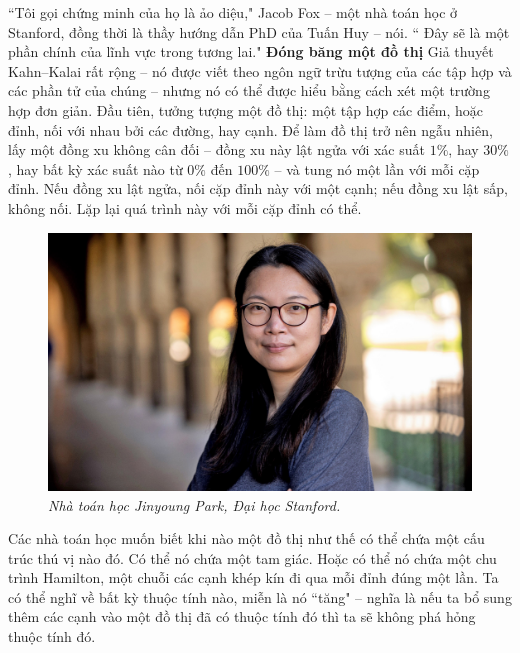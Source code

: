 \begin{multicols}{2}
	\vskip 0.1cm
	``Tôi gọi chứng minh của họ là ảo diệu,"  Jacob Fox -- một nhà toán học ở Stanford, đồng thời là thầy hướng dẫn PhD của Tuấn Huy -- nói. `` Đây sẽ là một phần chính của lĩnh vực trong tương lai."
	\vskip 0.1cm
	\textbf{\color{duongvaotoanhoc}Đóng băng một đồ thị}
	\vskip 0.1cm
	Giả thuyết Kahn--Kalai rất rộng -- nó được viết theo ngôn ngữ trừu tượng của các tập hợp và các phần tử của chúng -- nhưng nó có thể được hiểu bằng cách xét một trường hợp đơn giản. Đầu tiên, tưởng tượng một đồ thị: một tập hợp các điểm, hoặc đỉnh, nối với nhau bởi các đường, hay cạnh. Để làm đồ thị trở nên ngẫu nhiên, lấy một đồng xu không cân đối -- đồng xu này lật ngửa với xác suất $1\%$, hay $30\%$, hay bất kỳ xác suất nào từ $0\%$ đến $100\%$ -- và tung nó một lần với mỗi cặp đỉnh. Nếu đồng xu lật ngửa, nối cặp đỉnh này với một cạnh; nếu đồng xu lật sấp, không nối. Lặp lại quá trình này với mỗi cặp đỉnh \linebreak  có thể.
	\begin{figure}[H]
		\vspace*{-5pt}
		\centering
		\captionsetup{labelformat= empty, justification=centering}
		\includegraphics[width= 1\linewidth]{2}
		\caption{\small\textit{\color{duongvaotoanhoc}Nhà toán học Jinyoung Park, Đại học Stanford.}}
		\vspace*{-10pt}
	\end{figure}
	Các nhà toán học muốn biết khi nào một đồ thị như thế có thể chứa một cấu trúc thú vị nào đó. Có thể nó chứa một tam giác. Hoặc có thể nó chứa một chu trình Hamilton, một chuỗi các cạnh khép kín đi qua mỗi đỉnh đúng một lần. Ta có thể nghĩ về bất kỳ thuộc tính nào, miễn là nó ``tăng" -- nghĩa là nếu ta bổ sung thêm các cạnh vào một đồ thị đã có thuộc tính đó thì ta sẽ không phá hỏng thuộc tính đó.
	\vskip 0.1cm

\end{multicols}
